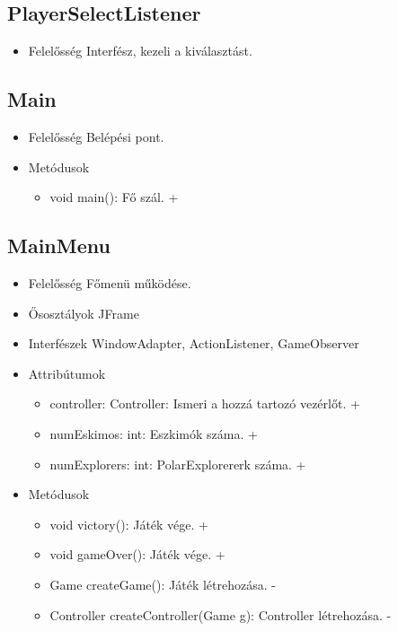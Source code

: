 \subsection{PlayerSelectListener}
\begin{itemize}
	\item Felelősség\newline
	Interfész, kezeli a kiválasztást.
\end{itemize}

\subsection{Main}
\begin{itemize}
	\item Felelősség\newline
	Belépési pont.
	\item Metódusok\newline
	\begin{itemize}
		\item void main(): Fő szál. +
	\end{itemize}
\end{itemize}

\subsection{MainMenu}
\begin{itemize}
	\item Felelősség\newline
	Főmenü működése.
	\item Ősosztályok\newline
	JFrame
	\item Interfészek\newline
	WindowAdapter, ActionListener, GameObserver
	\item Attribútumok\newline
	\begin{itemize}
		\item controller: Controller: Ismeri a hozzá tartozó vezérlőt. +	
		\item numEskimos: int: Eszkimók száma. +
		\item numExplorers: int: PolarExplorererk száma. +	
	\end{itemize}
	\item Metódusok\newline
	\begin{itemize}
		\item void victory(): Játék vége. +
		\item void gameOver(): Játék vége. +
		\item Game createGame(): Játék létrehozása. -
		\item Controller createController(Game g): Controller létrehozása. -
	\end{itemize}
\end{itemize}

